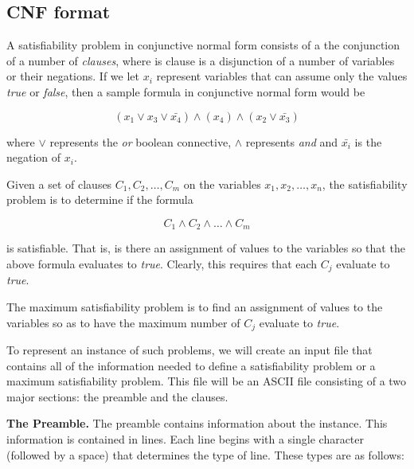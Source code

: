 \subsection{CNF format}

A satisfiability problem in conjunctive normal form consists of a the
conjunction of a number of {\it clauses}, where is clause is a
disjunction of a number of variables or their negations.  If we let
$x_i$ represent variables that can assume only the values {\it true}
or {\it false}, then a sample formula in conjunctive normal form would
be

$$(x_1\vee x_3\vee \bar{x_4})\wedge (x_4)\wedge (x_2\vee \bar{x_3})$$

\noindent where $\vee$ represents the {\it or} boolean connective,
$\wedge$ represents {\it and} and $\bar{x_i}$ is the negation of
$x_i$.

Given a set of clauses $C_1, C_2,\ldots, C_m$ on the variables $x_1,
x_2, \ldots, x_n$, the satisfiability problem is to determine if the
formula

$$C_1\wedge C_2\wedge\ldots\wedge C_m$$

\noindent is satisfiable.  That is, is there an assignment of values to the
variables so that the above formula evaluates to {\it true}.  Clearly,
this requires that each $C_j$ evaluate to {\it true}.

The maximum satisfiability problem is to find an assignment of values
to the variables so as to have the maximum number of $C_j$ evaluate to
{\it true}.

To represent an instance of such problems, we will create an input
file that contains all of the information needed to define a
satisfiability problem or a maximum satisfiability problem.  This file
will be an ASCII file consisting of a two major sections:  the
preamble and the clauses.

{\bf The Preamble.} The preamble contains information about the
instance.  This information is contained in lines.  Each line begins
with a single character (followed by a space) that determines the type
of line.  These types are as follows:

